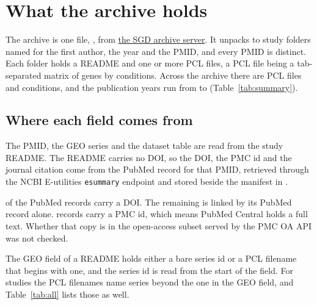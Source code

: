 
\section{What the archive holds}\label{sec:archive}

The archive is one file, , from
\href{http://sgd-archive.yeastgenome.org/expression/microarray/all_spell_datasets.tar.gz}{the
SGD archive server}. It unpacks to \spellNStudies{} study folders named for the
first author, the year and the PMID, and every PMID is distinct. Each folder
holds a README and one or more PCL files, a PCL file being a tab-separated
matrix of genes by conditions. Across the archive there are \spellNDatasets{}
PCL files and \spellNConditions{} conditions, and the publication years run from
\spellYearMin{} to \spellYearMax{} (Table~\ref{tab:summary}).



\subsection{Where each field comes from}\label{sec:fields}

The PMID, the GEO series and the dataset table are read from the study README.
The README carries no DOI, so the DOI, the PMC id and the journal citation come
from the PubMed record for that PMID, retrieved through the NCBI E-utilities
\texttt{esummary} endpoint and stored beside the manifest in
.

\spellNDoi{} of the \spellNStudies{} PubMed records carry a DOI. The remaining
\spellNNoDoi{} is linked by its PubMed record alone. \spellNPmc{} records carry
a PMC id, which means PubMed Central holds a full text. Whether that copy is in
the open-access subset served by the PMC OA API was not checked.

The GEO field of a README holds either a bare series id or a PCL filename that
begins with one, and the series id is read from the start of the field. For
\spellNGeoMultiSeries{} studies the PCL filenames name series beyond the one in
the GEO field, and Table~\ref{tab:all} lists those as well.
